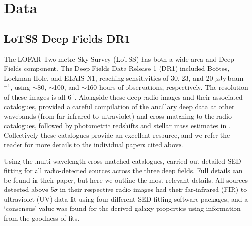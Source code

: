 \documentclass[usenatbib,fleqn,letters]{mnras}
\newcommand{\sarc}{$^{\prime\prime}\!\!$}
\newcommand{\muJybm}{$\mu$Jy$\,$beam$^{-1}$}
\begin{document}
\section{Data}
\label{sec:data}

\subsection{LoTSS Deep Fields DR1}
\label{subsec:dr1}
The LOFAR Two-metre Sky Survey (LoTSS) has both a wide-area \citep{shimwell_lofar_2017,shimwell_lofar_2021,shimwell_lofar_2022} and Deep Fields \citep{tasse_lofar_2021,sabater_lofar_2021} component. The Deep Fields Data Release 1 (DR1) included Boötes, Lockman Hole, and ELAIS-N1, reaching sensitivities of 30, 23, and 20 \muJybm , using $\sim$80, $\sim$100, and $\sim$160 hours of observations, respectively. The resolution of these images is all 6\sarc . Alongside these deep radio images and their associated catalogues, \cite{kondapally_lofar_2021} provided a careful compilation of the ancillary deep data at other wavebands (from far-infrared to ultraviolet) and cross-matching to the radio catalogues, followed by photometric redshifts and stellar mass estimates in \cite{duncan_lofar_2021}. Collectively these catalogues provide an excellent resource, and we refer the reader for more details to the individual papers cited above.

Using the multi-wavelength cross-matched catalogues,  carried out detailed SED fitting for all radio-detected sources across the three deep fields. Full details can be found in their paper, but here we outline the most relevant details. All sources detected above 5$\sigma$ in their respective radio images had their far-infrared (FIR) to ultraviolet (UV) data fit using four different SED fitting software packages, and a `consensus' value was found for the derived galaxy properties using information from the goodness-of-fits.
\end{document}
